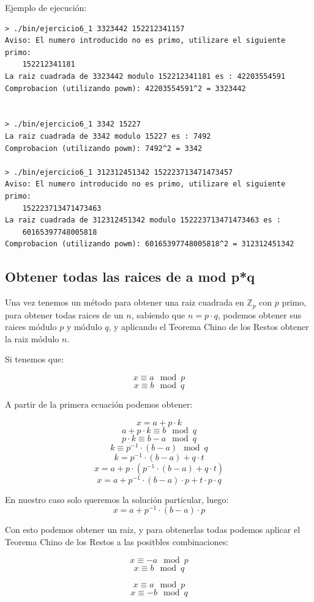 \documentclass[12pt, spanish]{article}
\begin{document}
Ejemplo de ejecución:

\begin{lstlisting}
> ./bin/ejercicio6_1 3323442 152212341157
Aviso: El numero introducido no es primo, utilizare el siguiente primo:
	152212341181
La raiz cuadrada de 3323442 modulo 152212341181 es : 42203554591
Comprobacion (utilizando powm): 42203554591^2 = 3323442


> ./bin/ejercicio6_1 3342 15227
La raiz cuadrada de 3342 modulo 15227 es : 7492
Comprobacion (utilizando powm): 7492^2 = 3342

> ./bin/ejercicio6_1 312312451342 152223713471473457
Aviso: El numero introducido no es primo, utilizare el siguiente primo:
	152223713471473463
La raiz cuadrada de 312312451342 modulo 152223713471473463 es :
	60165397748005818
Comprobacion (utilizando powm): 60165397748005818^2 = 312312451342
\end{lstlisting}



\subsection{Obtener todas las raices de a mod p*q}

Una vez tenemos un método para obtener una raiz cuadrada en $\mathbb{Z}_p$ con $p$ primo, para obtener todas raices de un $n$, sabiendo que $n = p \cdot q$, podemos obtener sus raices módulo $p$ y módulo $q$, y aplicando el Teorema Chino de los Restos obtener la raiz módulo $n$.

Si tenemos que:

$$x \equiv a \mod p$$
$$x \equiv b \mod q$$

A partir de la primera ecuación podemos obtener:

$$x = a + p \cdot k$$
$$a + p \cdot k \equiv b \mod q$$
$$p \cdot k \equiv b - a \mod q$$
$$k \equiv p^{-1} \cdot (b - a) \mod q$$
$$k = p^{-1} \cdot (b - a) + q \cdot t$$
$$x = a + p \cdot (p^{-1} \cdot (b - a) + q \cdot t )$$
$$x = a + p^{-1} \cdot (b - a) \cdot p + t \cdot p \cdot q$$

En nuestro caso solo queremos la solución particular, luego:
$$x = a + p^{-1} \cdot (b - a) \cdot p$$

Con esto podemos obtener un raiz, y para obtenerlas todas podemos aplicar el Teorema Chino de los Restos a las positbles combinaciones:

$$x \equiv -a \mod p$$
$$x \equiv b \mod q$$

$$x \equiv a \mod p$$
$$x \equiv -b \mod q$$
\end{document}
